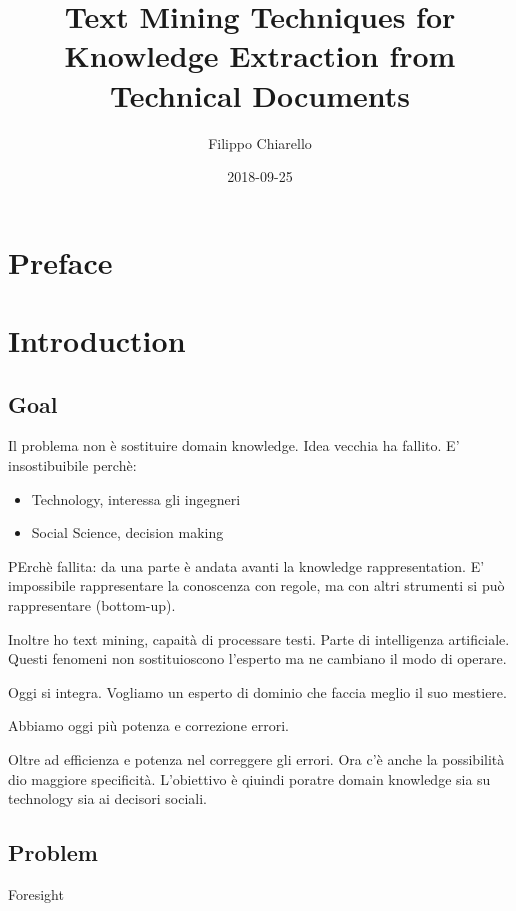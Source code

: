 \documentclass[]{book}
\title{Text Mining Techniques for Knowledge Extraction from Technical Documents}
\author{Filippo Chiarello}
\date{2018-09-25}
\providecommand{\tightlist}{%
  \setlength{\itemsep}{0pt}\setlength{\parskip}{0pt}}
\begin{document}
\maketitle

{
\setcounter{tocdepth}{1}
\tableofcontents
}
\chapter*{Preface}\label{preface}

\chapter{Introduction}\label{introduction}

\section{Goal}\label{goal}

Il problema non è sostituire domain knowledge. Idea vecchia ha fallito.
E' insostibuibile perchè:

\begin{itemize}
\tightlist
\item
  Technology, interessa gli ingegneri
\item
  Social Science, decision making
\end{itemize}

PErchè fallita: da una parte è andata avanti la knowledge
rappresentation. E' impossibile rappresentare la conoscenza con regole,
ma con altri strumenti si può rappresentare (bottom-up).

Inoltre ho text mining, capaità di processare testi. Parte di
intelligenza artificiale. Questi fenomeni non sostituioscono l'esperto
ma ne cambiano il modo di operare.

Oggi si integra. Vogliamo un esperto di dominio che faccia meglio il suo
mestiere.

Abbiamo oggi più potenza e correzione errori.

Oltre ad efficienza e potenza nel correggere gli errori. Ora c'è anche
la possibilità dio maggiore specificità. L'obiettivo è qiuindi poratre
domain knowledge sia su technology sia ai decisori sociali.

\section{Problem}\label{problem}

Foresight
\end{document}
